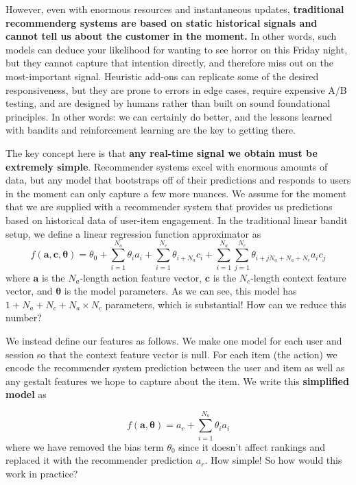 \documentclass[manuscript, nonacm, screen=true]{acmart}
\begin{document}
However, even with enormous resources and instantaneous updates, \textbf{traditional recommenderg systems are based on static historical signals and cannot tell us about the customer in the moment.} In other words, such models can deduce your likelihood for wanting to see horror on this Friday night, but they cannot capture that intention directly, and therefore miss out on the most-important signal. Heuristic add-ons can replicate some of the desired responsiveness, but they are prone to errors in edge cases, require expensive A/B testing, and are designed by humans rather than built on sound foundational principles. In other words: we can certainly do better, and the lessons learned with bandits and reinforcement learning are the key to getting there.

The key concept here is that \textbf{any real-time signal we obtain must be extremely simple}. Recommender systems excel with enormous amounts of data, but any model that bootstraps off of their predictions and responds to users in the moment can only capture a few more nuances. We assume for the moment that we are supplied with a recommender system that provides us predictions based on historical data of user-item engagement. In the traditional linear bandit setup, we define a linear regression function approximator as
\begin{equation}
    f(\mathbf{a},\mathbf{c},\boldsymbol{\theta}) = \theta_0 + \sum_{i=1}^{N_a}\theta_i a_i+\sum_{i=1}^{N_c}\theta_{i+N_a}c_i+\sum_{i=1}^{N_a}\sum_{j=1}^{N_c}\theta_{i+jN_a+N_a+N_c} a_i c_j
\end{equation}where $\mathbf{a}$ is the $N_a$-length action feature vector, $\mathbf{c}$ is the $N_c$-length context feature vector, and $\boldsymbol{\theta}$ is the model parameters. As we can see, this model has $1+N_a+N_c+N_a\times N_c$ parameters, which is substantial! How can we reduce this number?

We instead define our features as follows. We make one model for each user and session so that the context feature vector is null.  For each item (the action) we encode the recommender system prediction between the user and item as well as any gestalt features we hope to capture about the item. We write this \textbf{simplified model} as 

\begin{equation}
    f(\mathbf{a},\boldsymbol{\theta}) = a_r+\sum_{i=1}^{N_a}\theta_i a_i
\end{equation}where we have removed the bias term $\theta_0$ since it doesn't affect rankings and replaced it with the recommender prediction $a_r$. How simple! So how would this work in practice?
\end{document}
